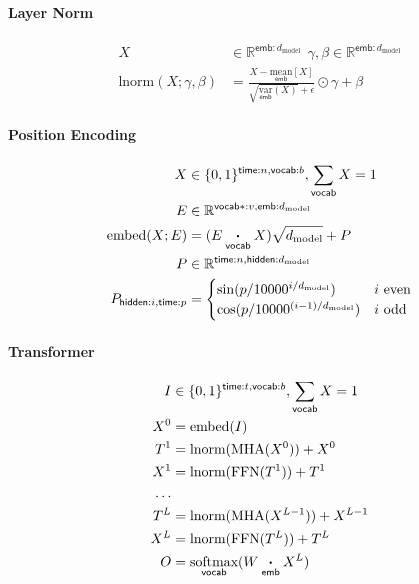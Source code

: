 \documentclass{article}
\newcommand{\reals}[0]{\mathbb{R}}
\newcommand{\name}[1]{\mathsf{#1}}
\newcommand{\ndot}[1]{\mathbin{\mathop{\thinspace\boldsymbol\cdot\thinspace}\limits_{\name{#1}}}}
\newcommand{\nfun}[2]{\underset{\name{#1}}{#2}}
\newcommand{\nsum}[1]{\mathop{\sum}\limits_{\name{#1}}}
\newcommand{\ntup}[2]{\name{#1}:#2}
\newcommand{\dmodel}{d_{\text{model}}}
\begin{document}
\paragraph{Layer Norm}

\begin{align*} 
X &\in \reals^{{ \ntup{emb}{\dmodel}}} \ \  \gamma, \beta \in \reals^{{ \ntup{emb}{\dmodel}}} \\
\text{lnorm}(X; \gamma, \beta) &= \frac{X - \nfun{emb}{\text{mean}}[X]}{\sqrt{\nfun{emb}{\text{var}}(X)} + \epsilon } \odot \gamma + \beta 
\end{align*}

\paragraph{Position Encoding}
\begin{align*} 
X &\in \{0, 1\}^{{\ntup{time}{n}, \ntup{vocab}{b}}}, \nsum{vocab} X = 1\\
E &\in \reals^{{\ntup{vocab*}{v}, \ntup{emb}{\dmodel}}} \\
\text{embed}(X; E) &= (E \ndot{vocab} X)\sqrt{\dmodel} + P \\
P &\in \reals^{{\ntup{time}{n}, \ntup{hidden}{\dmodel}}} \\
P_{\name{hidden}:i, \name{time}:p} & = \begin{cases} \sin(p / 10000^{i / \dmodel}) & \text{$i$ even} \\ 
                                                     \cos(p / 10000^{(i - 1) / \dmodel}) & \text{$i$ odd} \\                                        \end{cases} \\
\end{align*}

\paragraph{Transformer}

\begin{align*} 
I &\in \{0, 1\}^{{\ntup{time}{t}, \ntup{vocab}{b}}}, \nsum{vocab} X = 1\\
X^0 &= \text{embed}(I)\\
T^1 &= \text{lnorm}(\text{MHA}(X^0)) + X^0\\
X^1 &= \text{lnorm}(\text{FFN}(T^1)) + T^1\\
\ldots \\
T^{L} &= \text{lnorm}(\text{MHA}(X^{L-1})) + X^{L-1}\\
X^{L} &= \text{lnorm}(\text{FFN}(T^L)) + T^L\\
O &= \nfun{vocab}{\text{softmax}}(W \ndot{emb} X^L)
\end{align*}







\end{document}
